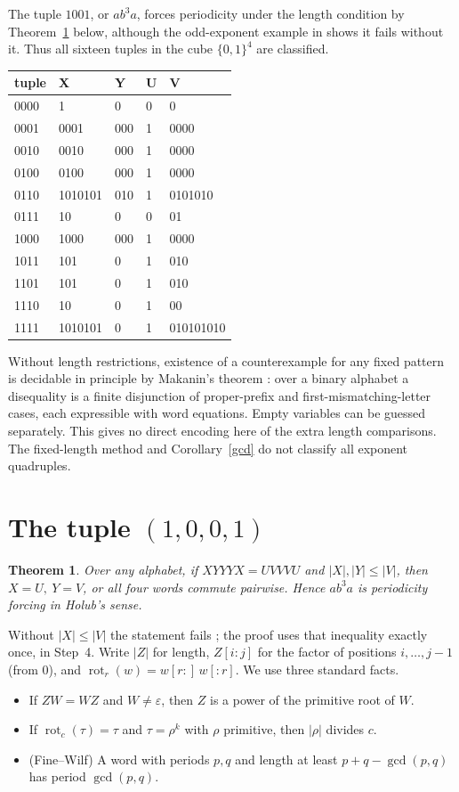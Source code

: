 \documentclass[11pt]{article}
\newtheorem{theorem}{Theorem}
\newcommand{\eps}{\varepsilon}
\theoremstyle{remark}\newtheorem*{remark}{Remark}
\begin{document}
The tuple \(1001\), or \(ab^3a\), forces periodicity under the length condition by Theorem~\ref{t1001} below, although the odd-exponent example in \cite[conclusion]{hh} shows it fails without it. Thus all sixteen tuples in the cube \(\{0,1\}^4\) are classified.
\begin{center}\small\ttfamily
\begin{tabular}{lllll}\toprule
tuple & X & Y & U & V\\\midrule
0000&1&0&0&0\\
0001&0001&000&1&0000\\
0010&0010&000&1&0000\\
0100&0100&000&1&0000\\
0110&1010101&010&1&0101010\\
0111&10&0&0&01\\
1000&1000&000&1&0000\\
1011&101&0&1&010\\
1101&101&0&1&010\\
1110&10&0&1&00\\
1111&1010101&0&1&010101010\\\bottomrule
\end{tabular}
\end{center}
Without length restrictions, existence of a counterexample for any fixed pattern is decidable in principle by Makanin's theorem \cite{mak}: over a binary alphabet a disequality is a finite disjunction of proper-prefix and first-mismatching-letter cases, each expressible with word equations. Empty variables can be guessed separately. This gives no direct encoding here of the extra length comparisons. The fixed-length method and Corollary~\ref{gcd} do not classify all exponent quadruples.

\section{The tuple \((1,0,0,1)\)}
\begin{theorem}\label{t1001}
Over any alphabet, if \(XYYYX=UVVVU\) and \(|X|,|Y|\le|V|\), then \(X=U,\ Y=V\), or all four words commute pairwise. Hence \(ab^3a\) is periodicity forcing in Holub's sense.
\end{theorem}
Without \(|X|\le|V|\) the statement fails \cite{hh}; the proof uses that inequality exactly once, in Step~4. Write \(|Z|\) for length, \(Z[i{:}j]\) for the factor of positions \(i,\dots,j-1\) (from \(0\)), and \(\operatorname{rot}_r(w)=w[r{:}]\,w[{:}r]\). We use three standard facts.
\begin{itemize}
\item[(F1)] If \(ZW=WZ\) and \(W\ne\eps\), then \(Z\) is a power of the primitive root of \(W\).
\item[(F2)] If \(\operatorname{rot}_c(\tau)=\tau\) and \(\tau=\rho^k\) with \(\rho\) primitive, then \(|\rho|\) divides \(c\).
\item[(F3)] (Fine--Wilf) A word with periods \(p,q\) and length at least \(p+q-\gcd(p,q)\) has period \(\gcd(p,q)\).
\end{itemize}
\end{document}
